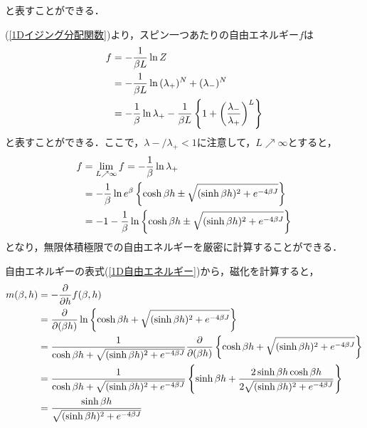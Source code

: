 \documentclass[a4paper,11pt]{jsreport}
\begin{document}
と表すことができる．\par
(\ref{1Dイジング分配関数})より，スピン一つあたりの自由エネルギー$f$は
\begin{align}
  f
   & = -\frac{1}{\beta L} \ln{Z} \notag                                                                                              \\
   & = -\frac{1}{\beta L} \ln{(\lambda_{+})^N + (\lambda_{-})^N} \notag                                                              \\
   & = -\frac{1}{\beta} \ln{\lambda_{+}} - \frac{1}{\beta L} \left\{ 1 + \left( \frac{\lambda_{-}}{\lambda_{+}} \right)^{L} \right\}
\end{align}
と表すことができる．ここで，$\lambda{-}/\lambda_{+}<1$に注意して，$L \nearrow \infty$とすると，
\begin{align}
  f
   & = \lim_{L \nearrow \infty} f = -\frac{1}{\beta} \ln{\lambda_{+}} \notag                                                   \\
   & = -\frac{1}{\beta} \ln{e^{\beta} \left\{ \cosh{\beta h} \pm{\sqrt{(\sinh{\beta h})^2 + e^{-4\beta J}}}\right\}} \notag    \\
   & = -1 -\frac{1}{\beta} \ln{\left\{\cosh{\beta h} \pm{\sqrt{(\sinh{\beta h})^2 + e^{-4\beta J}}}\right\}} \label{1D自由エネルギー}
\end{align}
となり，無限体積極限での自由エネルギーを厳密に計算することができる．\par
自由エネルギーの表式(\ref{1D自由エネルギー})から，磁化を計算すると，
\begin{align}
  m(\beta, h)
   & = -\frac{\partial}{\partial h} f(\beta, h) \notag                                                                                                                                                   \\
   & = \frac{\partial}{\partial (\beta h)} \ln{\left\{ \cosh{\beta h} + \sqrt{(\sinh{\beta h})^2 + e^{-4\beta J}} \right\}} \notag                                                                       \\
   & = \frac{1}{\cosh{\beta h} + \sqrt{(\sinh{\beta h})^2 + e^{-4\beta J}}} \frac{\partial}{\partial (\beta h)}\left\{ \cosh{\beta h} + \sqrt{(\sinh{\beta h})^2 + e^{-4\beta J}} \right\} \notag        \\
   & =  \frac{1}{\cosh{\beta h} + \sqrt{(\sinh{\beta h})^2 + e^{-4\beta J}}} \left\{ \sinh{\beta h} + \frac{2\sinh{\beta h} \cosh{\beta h}}{2 \sqrt{(\sinh{\beta h})^2 + e^{-4\beta J}}} \right\} \notag \\
   & = \frac{\sinh{\beta h}}{\sqrt{(\sinh{\beta h})^2 + e^{-4\beta J}}}
\end{align}
\end{document}
